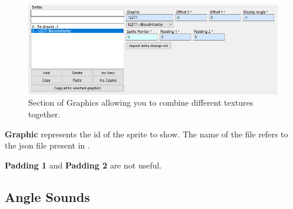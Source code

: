     \begin{figure}[ht]
        \centering
        \includegraphics[width=1.0\textwidth]{src/images/deltas}
        \caption{Section of Graphics allowing you to combine different textures together.}
        \label{fig:deltas}
    \end{figure}

    \textbf{Graphic} represents the id of the sprite to show. The name of the file refers to the json file present in .

    \textbf{Padding 1} and \textbf{Padding 2} are not useful.

    \subsection{Angle Sounds}

    
